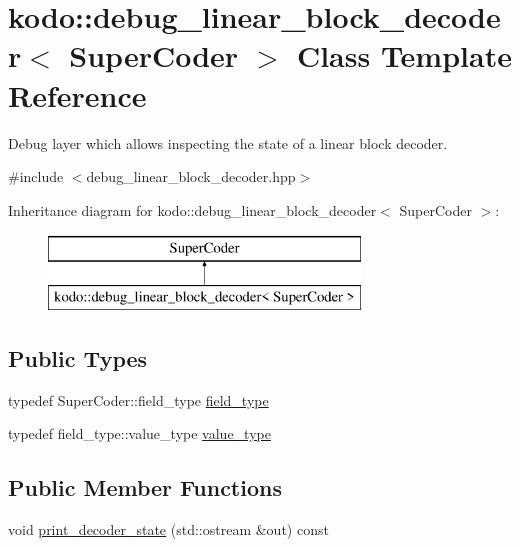 \hypertarget{classkodo_1_1debug__linear__block__decoder}{\section{kodo\-:\-:debug\-\_\-linear\-\_\-block\-\_\-decoder$<$ Super\-Coder $>$ Class Template Reference}
\label{classkodo_1_1debug__linear__block__decoder}
}


Debug layer which allows inspecting the state of a linear block decoder.  




{\ttfamily \#include $<$debug\-\_\-linear\-\_\-block\-\_\-decoder.\-hpp$>$}

Inheritance diagram for kodo\-:\-:debug\-\_\-linear\-\_\-block\-\_\-decoder$<$ Super\-Coder $>$\-:\begin{figure}[H]
\begin{center}
\leavevmode
\includegraphics[height=2.000000cm]{classkodo_1_1debug__linear__block__decoder}
\end{center}
\end{figure}
\subsection*{Public Types}
\begin{DoxyCompactItemize}
\item 
typedef Super\-Coder\-::field\-\_\-type \hyperlink{classkodo_1_1debug__linear__block__decoder_ac2c8432c147cc801713c1feeabb012b9}{field\-\_\-type}
\begin{DoxyCompactList}\small\item\em \end{DoxyCompactList}\item 
typedef field\-\_\-type\-::value\-\_\-type \hyperlink{classkodo_1_1debug__linear__block__decoder_a639e9bd238f5ef5f54d2970217c76d2a}{value\-\_\-type}
\begin{DoxyCompactList}\small\item\em \end{DoxyCompactList}\end{DoxyCompactItemize}
\subsection*{Public Member Functions}
\begin{DoxyCompactItemize}
\item 
void \hyperlink{classkodo_1_1debug__linear__block__decoder_a54c858fcc072f9e199fa8bc5eb08f467}{print\-\_\-decoder\-\_\-state} (std\-::ostream \&out) const 
\end{DoxyCompactItemize}


